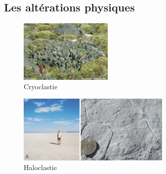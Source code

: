 \documentclass{beamer}
\begin{document}
\subsection{Les altérations physiques}
\begin{frame}
  \begin{center}
    \begin{figure}
      \includegraphics[width=4.5cm]{Images/Diapos/Alteration/Physique/cryoclastie.jpg}
      \caption{Cryoclastie}
    \end{figure}
  \end{center}
  \begin{center}
    \begin{figure}
      \includegraphics[width=7.4cm]{Images/Diapos/Alteration/Physique/haloclastie3.jpg}
      \caption{Haloclastie}
    \end{figure}
  \end{center}
\end{frame}
\end{document}
